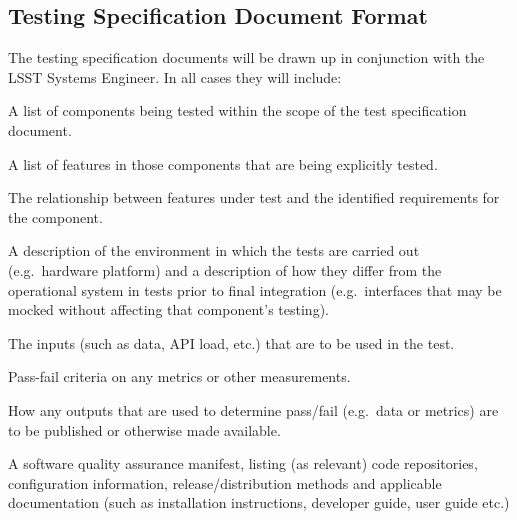 \subsection{Testing Specification Document Format}\label{sect:tsform}

The testing specification documents will be drawn up in conjunction with the LSST Systems Engineer. In all cases they will include:

\begin{itemize_single}

\item A list of components being tested within the scope of the test specification document.

\item A list of features in those components that are being explicitly tested.

\item The relationship between features under test and the identified requirements for the component.

\item A description of the environment in which the tests are carried out (e.g.\ hardware platform) and a description of how they differ from the operational system in tests prior to final integration (e.g.\ interfaces that may be mocked without affecting that component's testing).

\item The inputs (such as data, API load, etc.) that are to be used in the test.

\item Pass-fail criteria on any metrics or other measurements.

\item How any outputs that are used to determine pass/fail (e.g.\ data or metrics) are to be published or otherwise made available.

\item A software quality assurance manifest, listing (as relevant) code repositories, configuration information, release/distribution methods and applicable documentation (such as installation instructions, developer guide, user guide etc.)

\end{itemize_single}

